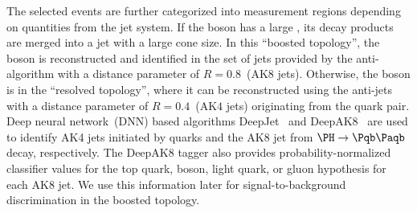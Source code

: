 \documentclass[a4paper,11pt]{article}
\newcommand{\Pb}{{{\Pqb}}\xspace}
\newcommand{\PAb}{{{{\Paqb}}}\xspace}
\begin{document}
The selected events are further categorized into measurement regions depending on quantities from the jet system. 
If the \PH boson has a large \pt, its decay products are merged into a jet with a large cone size. 
In this ``boosted topology'', the \PH boson is reconstructed and identified in the set of jets provided by the anti-\kt algorithm with a distance parameter of $R=0.8$~(AK8 jets).
Otherwise, the \PH boson is in the ``resolved topology'', 
where it can be reconstructed using the anti-\kt jets with a distance parameter of $R=0.4$~(AK$4$ jets) originating from the \Pb quark pair. 
Deep neural network~(DNN) based algorithms DeepJet~\cite{Bols:2020bkb} and DeepAK8~\cite{Sirunyan:2020lcu} are used to identify AK4 jets initiated by \Pb quarks and the AK8 jet from $\PH \rightarrow \Pb \PAb$ decay, respectively.
The DeepAK8 tagger also provides probability-normalized classifier values for the top quark, \PW boson, light quark, or gluon hypothesis for each AK8 jet. 
We use this information later for signal-to-background discrimination in the boosted topology. 
\end{document}
